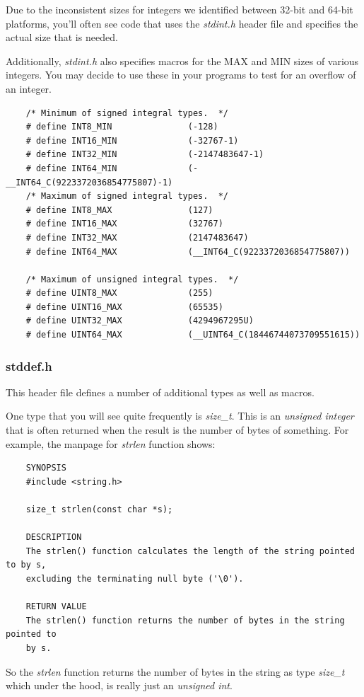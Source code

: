 \documentclass[../main.tex]{subfiles}
\begin{document}
	Due to the inconsistent sizes for integers we identified between 32-bit and 64-bit platforms, you'll often see code that uses the \textit{stdint.h} header file and specifies the actual size that is needed.  
	
	Additionally, \textit{stdint.h} also specifies macros for the MAX and MIN sizes of various integers.  You may decide to use these in your programs to test for an overflow of an integer.
	
	\begin{verbatim}
	/* Minimum of signed integral types.  */
	# define INT8_MIN               (-128)
	# define INT16_MIN              (-32767-1)
	# define INT32_MIN              (-2147483647-1)
	# define INT64_MIN              (-__INT64_C(9223372036854775807)-1)
	/* Maximum of signed integral types.  */
	# define INT8_MAX               (127)
	# define INT16_MAX              (32767)
	# define INT32_MAX              (2147483647)
	# define INT64_MAX              (__INT64_C(9223372036854775807))
	
	/* Maximum of unsigned integral types.  */
	# define UINT8_MAX              (255)
	# define UINT16_MAX             (65535)
	# define UINT32_MAX             (4294967295U)
	# define UINT64_MAX             (__UINT64_C(18446744073709551615))
	\end{verbatim}
	
	\subsubsection{stddef.h}
	This header file defines a number of additional types as well as macros.  
	
	One type that you will see quite frequently is \textit{size\_t}.  This is an \textit{unsigned integer} that is often returned when the result is the number of bytes of something.  For example, the manpage for \textit{strlen} function shows:
	
	\begin{verbatim}
	SYNOPSIS
	#include <string.h>
	
	size_t strlen(const char *s);
	
	DESCRIPTION
	The strlen() function calculates the length of the string pointed to by s, 
	excluding the terminating null byte ('\0').
	
	RETURN VALUE
	The strlen() function returns the number of bytes in the string pointed to 
	by s.
	\end{verbatim}
	
	So the \textit{strlen} function returns the number of bytes in the string as type \textit{size\_t} which under the hood, is really just an \textit{unsigned int}.
	
\end{document}
